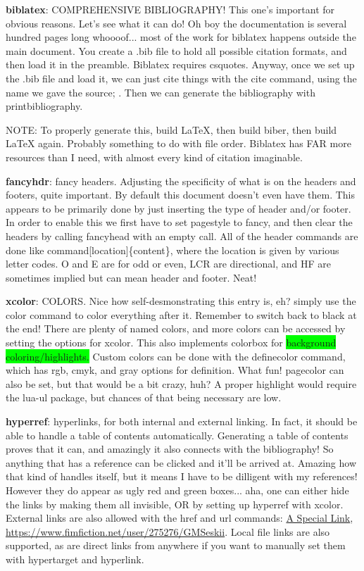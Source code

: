 \documentclass{article}
\begin{document}
\textbf{biblatex}: COMPREHENSIVE BIBLIOGRAPHY! This one's important for obvious reasons. Let's see what it can do! Oh boy the documentation is several hundred pages long whoooof... most of the work for biblatex happens outside the main document. You create a .bib file to hold all possible citation formats, and then load it in the preamble. Biblatex requires csquotes. Anyway, once we set up the .bib file and load it, we can just cite things with the cite command, using the name we gave the source; \cite{booka}. \nocite{*} Then we can generate the bibliography with printbibliography.

\printbibliography

NOTE: To properly generate this, build LaTeX, then build biber, then build LaTeX again. Probably something to do with file order. Biblatex has FAR more resources than I need, with almost every kind of citation imaginable. 

\textbf{fancyhdr}: fancy headers. Adjusting the specificity of what is on the headers and footers, quite important. By default this document doesn't even have them. This appears to be primarily done by just inserting the type of header and/or footer. In order to enable this we first have to set pagestyle to fancy, and then clear the headers by calling fancyhead with an empty call. All of the header commands are done like command[location]\{content\}, where the location is given by various letter codes. O and E are for odd or even, LCR are directional, and HF are sometimes implied but can mean header and footer. Neat!

\textbf{xcolor}: \color{red}C\color{orange}O\color{yellow}L\color{green}O\color{blue}R\color{purple}S\color{black}. Nice how self-desmonstrating this entry is, eh? simply use the color command to color everything after it. Remember to switch back to black at the end! There are plenty of named colors, and more colors can be accessed by setting the options for xcolor. This also implements colorbox for \colorbox{lime}{background coloring/highlights.} Custom colors can be done with the definecolor command, which has rgb, cmyk, and gray options for definition. What fun! pagecolor can also be set, but that would be a bit crazy, huh? A proper highlight would require the lua-ul package, but chances of that being necessary are low.

\textbf{hyperref}: hyperlinks, for both internal and external linking. In fact, it should be able to handle a table of contents automatically. Generating a table of contents proves that it can, and amazingly it also connects with the bibliography!  So anything that has a reference can be clicked and it'll be arrived at. Amazing how that kind of handles itself, but it means I have to be dilligent with my references! However they do appear as ugly red and green boxes... aha, one can either hide the links by making them all invisible, OR by setting up hyperref with xcolor. External links are also allowed with the href and url commands: \href{https://www.youtube.com/watch?v=dQw4w9WgXcQ}{A Special Link}, \url{https://www.fimfiction.net/user/275276/GMSeskii}. Local file links are also supported, as are direct links from anywhere if you want to manually set them with hypertarget and hyperlink. 
\end{document}
